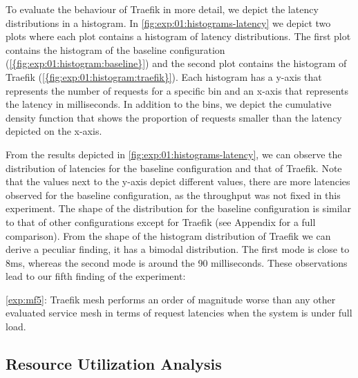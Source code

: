 To evaluate the behaviour of Traefik in more detail, we depict the latency distributions in a histogram. In \cref{fig:exp:01:histograms-latency} we depict two plots where each plot contains a histogram of latency distributions. The first plot contains the histogram of the baseline configuration (\cref{{fig:exp:01:histogram:baseline}}) and the second plot contains the histogram of Traefik  (\cref{{fig:exp:01:histogram:traefik}}). Each histogram has a y-axis that represents the number of requests for a specific bin and an x-axis that represents the latency in milliseconds. In addition to the bins, we depict the cumulative density function that shows the proportion of requests smaller than the latency depicted on the x-axis. 

From the results depicted in \cref{fig:exp:01:histograms-latency}, we can observe the distribution of latencies for the baseline configuration and that of Traefik. Note that the values next to the y-axis depict different values, there are more latencies observed for the baseline configuration, as the throughput was not fixed in this experiment. The shape of the distribution for the baseline configuration is similar to that of other configurations except for Traefik (see Appendix for a full comparison). From the shape of the histogram distribution of Traefik we can derive a peculiar finding, it has a bimodal distribution. The first mode is close to 8ms, whereas the second mode is around the 90 milliseconds. These observations lead to our fifth  finding of the experiment: 

\begin{shaded*}
    \noindent
    \ref{exp:mf5}: 
    Traefik mesh performs an order of magnitude worse than any other evaluated service mesh in terms of request latencies when the system is under full load.
\end{shaded*}

\subsection{Resource Utilization Analysis}
\label{sec:experiments:results:per-experiment:01:throughput}


